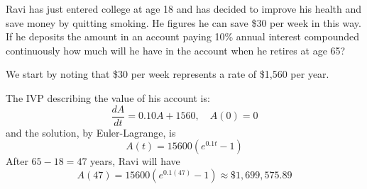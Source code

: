 \documentclass{beamer}
\begin{document}
\begin{frame}
\begin{example}
Ravi has just entered college at age 18 and has decided to improve his health and save money by quitting smoking. He figures he can save \$30 per week in this way. If he deposits the amount in an account paying 10\% annual interest compounded continuously how much will he have in the account when he retires at age 65?\pause

\vspace{1.5mm}
We start by noting that \$30 per week represents a rate of \$1,560 per year. \pause

\vspace{1.5mm}
The IVP describing the value of his account is:
\begin{equation*}
\dfrac{dA}{dt} = 0.10 A + 1560,\quad A(0)=0
\end{equation*}\pause
and the solution, by Euler-Lagrange, is
\begin{equation*}
A(t) = 15600(e^{0.1t}-1)
\end{equation*}\pause
After $65-18=47$ years, Ravi will have
\begin{equation*}
A(47) = 15600(e^{0.1(47)}-1) \approx \$1,699,575.89
\end{equation*}
\end{example}
\end{frame}
\end{document}
